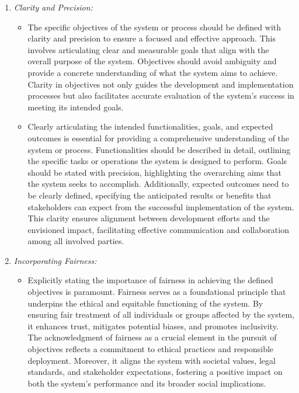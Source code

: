 \documentclass[12pt,a4paper,openright,twoside]{book}
\begin{document}
\begin{enumerate}

    \item \emph{Clarity and Precision:}

        \begin{itemize}

            \item 
            The specific objectives of the system or process should be defined with clarity and precision to ensure a focused and effective approach. This involves articulating clear and measurable goals that align with the overall purpose of the system. Objectives should avoid ambiguity and provide a concrete understanding of what the system aims to achieve. Clarity in objectives not only guides the development and implementation processes but also facilitates accurate evaluation of the system's success in meeting its intended goals.
            
            \item 
            Clearly articulating the intended functionalities, goals, and expected outcomes is essential for providing a comprehensive understanding of the system or process. Functionalities should be described in detail, outlining the specific tasks or operations the system is designed to perform. Goals should be stated with precision, highlighting the overarching aims that the system seeks to accomplish. Additionally, expected outcomes need to be clearly defined, specifying the anticipated results or benefits that stakeholders can expect from the successful implementation of the system. This clarity ensures alignment between development efforts and the envisioned impact, facilitating effective communication and collaboration among all involved parties.
        
        \end{itemize}
    
    \item \emph{Incorporating Fairness:}

        \begin{itemize}
            
            \item Explicitly stating the importance of fairness in achieving the defined objectives is paramount. Fairness serves as a foundational principle that underpins the ethical and equitable functioning of the system. By ensuring fair treatment of all individuals or groups affected by the system, it enhances trust, mitigates potential biases, and promotes inclusivity. The acknowledgment of fairness as a crucial element in the pursuit of objectives reflects a commitment to ethical practices and responsible deployment. Moreover, it aligns the system with societal values, legal standards, and stakeholder expectations, fostering a positive impact on both the system's performance and its broader social implications.
            

\end{itemize}
\end{enumerate}
\end{document}

